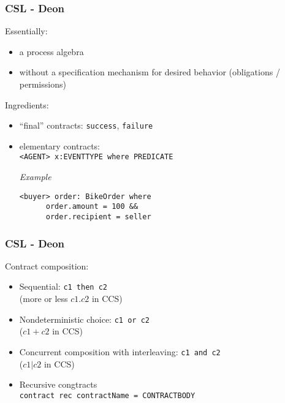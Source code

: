 \documentclass{beamer}
\begin{document}
\begin{frame}[fragile]\frametitle{CSL - Deon}

  Essentially:
  \begin{itemize}
  \item a process algebra 
  \item without a specification mechanism for desired behavior (obligations / permissions)
  \end{itemize}

  Ingredients:
  \begin{itemize}
  \item ``final'' contracts: \texttt{success}, \texttt{failure}
  \item elementary contracts:\\
    \texttt{<AGENT> x:EVENTTYPE where PREDICATE}

    \emph{Example}
\begin{verbatim}
<buyer> order: BikeOrder where
      order.amount = 100 &&
      order.recipient = seller
\end{verbatim}
    
  \end{itemize}

\end{frame}


\begin{frame}[fragile]\frametitle{CSL - Deon}

  Contract composition:
  \begin{itemize}
  \item Sequential: \texttt{c1 then c2}\\
    (more or less $c1 . c2$ in CCS)
  \item Nondeterministic choice: \texttt{c1 or c2}\\
    ($c1 + c2$ in CCS)
  \item Concurrent composition with interleaving: \texttt{c1 and c2}\\
    ($c1 | c2$ in CCS)
  \item Recursive congtracts \\
    \texttt{contract rec contractName = CONTRACTBODY}
  \end{itemize}

\end{frame}
\end{document}
